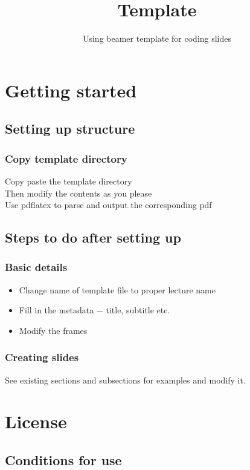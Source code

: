 
\title[Template]{Template}
\subtitle[Using beamer template]{Using beamer template for coding slides}


\section{Getting started}
\subsection{Setting up structure}

\begin{frame}
    \frametitle{Copy template directory}
    Copy paste the template directory \pause{} \\
    Then modify the contents as you please \pause{} \\
    Use pdflatex to parse and output the corresponding pdf \\
\end{frame}

\subsection{Steps to do after setting up}
\begin{frame}
    \frametitle{Basic details}
    \begin{itemize}
        \item Change name of template file to proper lecture name
        \item Fill in the metadata $-$ title, subtitle etc.
        \item Modify the frames
    \end{itemize}
\end{frame}

\begin{frame}
    \frametitle{Creating slides}
    See existing sections and subsections for examples and modify it.
\end{frame}

\section{License}
\subsection{Conditions for use}

